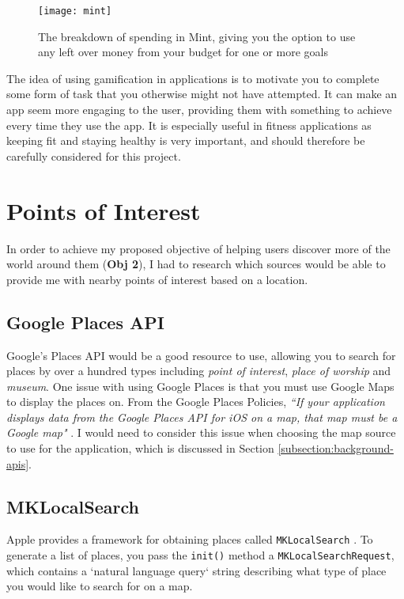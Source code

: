 \begin{figure}[hbt]
  \centering
  \texttt{[image: mint]}
  \caption{The breakdown of spending in Mint, giving you the option to use any left over money from your budget for one or more goals \cite{IntuitInc.a}}
  \label{fig:mint}
\end{figure}

The idea of using gamification in applications is to motivate you to complete some form of task that you otherwise might not have attempted. It can make an app seem more engaging to the user, providing them with something to achieve every time they use the app. It is especially useful in fitness applications as keeping fit and staying healthy is very important, and should therefore be carefully considered for this project.


\section{Points of Interest}

In order to achieve my proposed objective of helping users discover more of the world around them (\textbf{Obj 2}), I had to research which sources would be able to provide me with nearby points of interest based on a location.

\subsection{Google Places API}

Google's Places API \cite{GoogleInc.b} would be a good resource to use, allowing you to search for places by over a hundred types including \textit{point of interest}, \textit{place of worship} and \textit{museum}. One issue with using Google Places is that you must use Google Maps to display the places on. From the Google Places Policies, \textit{``If your application displays data from the Google Places API for iOS on a map, that map must be a Google map"} \cite{GoogleInc.c}. I would need to consider this issue when choosing the map source to use for the application, which is discussed in Section \ref{subsection:background-apis}.

\subsection{MKLocalSearch}

Apple provides a framework for obtaining places called \texttt{MKLocalSearch} \cite{AppleInc.b}. To generate a list of places, you pass the \texttt{init()} method a \texttt{MKLocalSearchRequest}, which contains a `natural language query` string describing what type of place you would like to search for on a map.

